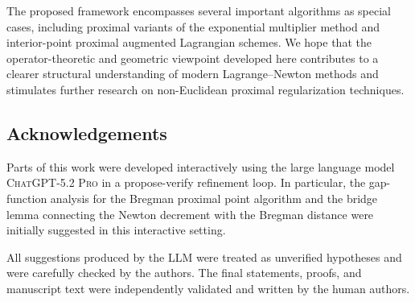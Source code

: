 \documentclass[11pt,onecolumn]{article}
\theoremstyle{remark}
\begin{document}
The proposed framework encompasses several important algorithms as special cases, including proximal variants of the exponential multiplier method and interior-point proximal augmented Lagrangian schemes. We hope that the operator-theoretic and geometric viewpoint developed here contributes to a clearer structural understanding of modern Lagrange--Newton methods and stimulates further research on non-Euclidean proximal regularization techniques.

\subsection*{Acknowledgements}
Parts of this work were developed interactively using the large language model \textsc{ChatGPT-5.2 Pro} in a propose-verify refinement loop. In particular, the gap-function analysis for the Bregman proximal point algorithm and the bridge lemma connecting the Newton decrement with the Bregman distance were initially suggested in this interactive setting.

All suggestions produced by the LLM were treated as unverified hypotheses and were carefully checked by the authors. The final statements, proofs, and manuscript text were independently validated and written by the human authors.
\printbibliography
\end{document}

